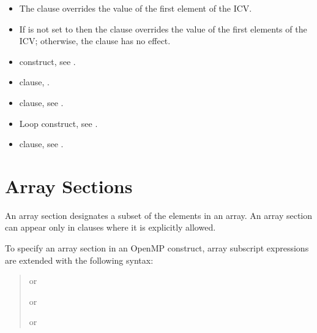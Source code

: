 \comments
\begin{itemize}
\item The  clause overrides the value of the first element of the 
 ICV.

\item If  is not set to  then the  clause overrides the value of the 
first elements of the  ICV; otherwise, the  clause has no effect. 
\end{itemize}

\crossreferences
\begin{itemize}
\item {} construct, see 
.

\item {} clause, 
.

\item {} clause, see 
.

\item Loop construct, see 
.

\item {} clause, see 
.
\end{itemize}










\filbreak
\section{Array Sections}
\label{sec:Array Sections}
An array section designates a subset of the elements in an array. An array section can
appear only in clauses where it is explicitly allowed.

\ccppspecificstart
To specify an array section in an OpenMP construct, array subscript expressions are 
extended with the following syntax:

\begin{quote}
 or

 or

 or

\code{[\plc{ }:\plc{ }]}
\end{quote}

